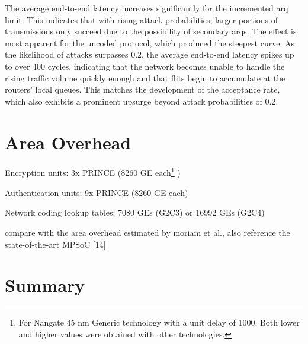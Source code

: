 The average end-to-end latency increases significantly for the incremented \gls{arq} limit. This indicates that with rising attack probabilities,
larger portions of transmissions only succeed due to the possibility of secondary \glspl{arq}. The effect is most apparent for the uncoded protocol, which
produced the steepest curve. As the likelihood of attacks surpasses 0.2, the average end-to-end latency spikes up to over 400 cycles, indicating that the
network becomes unable to handle the rising traffic volume quickly enough and that flits begin to accumulate at the routers' local queues. This matches
the development of the acceptance rate, which also exhibits a prominent upsurge beyond attack probabilities of 0.2.

\section{Area Overhead}
Encryption units: 3x PRINCE (8260 GE each\footnote{For Nangate 45 nm Generic technology with a unit delay of 1000. Both lower and higher values were
obtained with other technologies.} \cite[16]{borghoff12prince})

Authentication units: 9x PRINCE (8260 GE each)

Network coding lookup tables: 7080 GEs (G2C3) or 16992 GEs (G2C4) \cite[5]{moriam18activeattackers}

compare with the area overhead estimated by moriam et al., also reference the state-of-the-art MPSoC [14]

\section{Summary}

\iffalse
"Results for IWA-NC confirm the alleged positive effect of NC in unreliable networks"

"Creation rate adjustment to keep the base injection rate constant is reflected in the differing information rates"

"IDA: 4 flits need to arrive unharmed for successful transmission unit, 3 for FGA, and 2 for IWA"

"NC proves to provide a performance improvement, although more in the sense of less residual errors than a decrease in latency since ARQs are still
limited to 1 per transmission unit across all variants."
\fi
